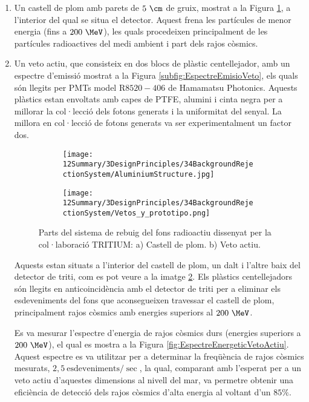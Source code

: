 \begin{enumerate}

\item{} Un castell de plom amb parets de $5~\cm$ de gruix, mostrat a la Figura \ref{subfig:CastellPlom}, a l'interior del qual se situa el detector. Aquest frena les partícules de menor energia (fins a $200~\MeV$), les quals procedeixen principalment de les partícules radioactives del medi ambient i part dels rajos còsmics.

\item{} Un veto actiu, que consisteix en dos blocs de plàstic centellejador, amb un espectre d'emissió mostrat a la Figura \ref{subfig:EspectreEmisioVeto}, els quals són llegits per PMTs model R$8520-406$ de Hamamatsu Photonics. Aquests plàstics estan envoltats amb capes de PTFE, alumini i cinta negra per a millorar la col·lecció dels fotons generats i la uniformitat del senyal. La millora en col·lecció de fotons generats va ser experimentalment un factor dos.
\begin{figure}
\centering
    \begin{subfigure}[b]{0.7\textwidth}
    \centering
    \texttt{[image: 12Summary/3DesignPrinciples/34BackgroundRejectionSystem/AluminiumStructure.jpg]}  
        \caption{}\label{subfig:CastellPlom}
    \end{subfigure}
    \hfill
    \begin{subfigure}[b]{0.7\textwidth}
    \centering
    \texttt{[image: 12Summary/3DesignPrinciples/34BackgroundRejectionSystem/Vetos\_y\_prototipo.png]}  
    \caption{\label{subfig:VetoActiu}}
    \end{subfigure}
\caption{Parts del sistema de rebuig del fons radioactiu dissenyat per la col·laboració TRITIUM: a) Castell de plom. b) Veto actiu. \label{fig:SistemaRebuigFonsRadioactiu}}
\end{figure}
Aquests estan situats a l'interior del castell de plom, un dalt i l'altre baix del detector de triti, com es pot veure a la imatge \ref{subfig:VetoActiu}. Els plàstics centellejadors són llegits en anticoincidència amb el detector de triti per a eliminar els esdeveniments del fons que aconsegueixen travessar el castell de plom, principalment rajos còsmics amb energies superiors al $200~\MeV$. 

Es va mesurar l'espectre d'energia de rajos còsmics durs (energies superiors a $200~\MeV$), el qual es mostra a la Figura \ref{fig:EspectreEnergeticVetoActiu}. Aquest espectre es va utilitzar per a determinar la freqüència de rajos còsmics mesurats, $2,5~\text{esdeveniments}/\sec$, la qual, comparant amb l'esperat per a un veto actiu d'aquestes dimensions al nivell del mar, va permetre obtenir una eficiència de detecció dels rajos còsmics d'alta energia al voltant d'un $85\%$.


\end{enumerate}
